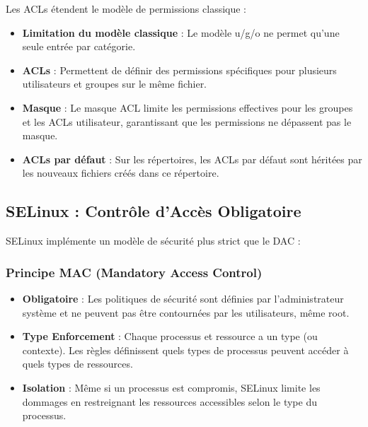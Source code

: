 \documentclass[12pt,a4paper]{article}
\begin{document}
Les ACLs étendent le modèle de permissions classique :

\begin{itemize}
    \item \textbf{Limitation du modèle classique} : Le modèle u/g/o ne permet qu'une seule entrée par catégorie.
    
    \item \textbf{ACLs} : Permettent de définir des permissions spécifiques pour plusieurs utilisateurs et groupes sur le même fichier.
    
    \item \textbf{Masque} : Le masque ACL limite les permissions effectives pour les groupes et les ACLs utilisateur, garantissant que les permissions ne dépassent pas le masque.
    
    \item \textbf{ACLs par défaut} : Sur les répertoires, les ACLs par défaut sont héritées par les nouveaux fichiers créés dans ce répertoire.
\end{itemize}

\subsection{SELinux : Contrôle d'Accès Obligatoire}

SELinux implémente un modèle de sécurité plus strict que le DAC :

\subsubsection{Principe MAC (Mandatory Access Control)}

\begin{itemize}
    \item \textbf{Obligatoire} : Les politiques de sécurité sont définies par l'administrateur système et ne peuvent pas être contournées par les utilisateurs, même root.
    
    \item \textbf{Type Enforcement} : Chaque processus et ressource a un type (ou contexte). Les règles définissent quels types de processus peuvent accéder à quels types de ressources.
    
    \item \textbf{Isolation} : Même si un processus est compromis, SELinux limite les dommages en restreignant les ressources accessibles selon le type du processus.
\end{itemize}
\end{document}
